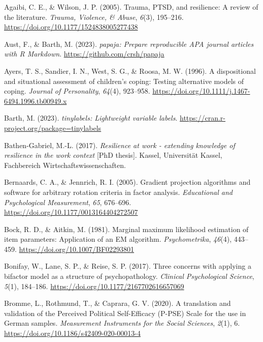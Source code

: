 \documentclass[
  man,floatsintext]{apa7}
\newlength{\cslhangindent}
\newenvironment{CSLReferences}[2] %
 {\begin{list}{}{%
  \setlength{\itemindent}{0pt}
  \setlength{\leftmargin}{0pt}
  \setlength{\parsep}{0pt}
  \ifodd #1
   \setlength{\leftmargin}{\cslhangindent}
   \setlength{\itemindent}{-1\cslhangindent}
  \fi
  \setlength{\itemsep}{#2\baselineskip}}}
 {\end{list}}
\begin{document}
\label{refs}
\begin{CSLReferences}{1}{0}
Agaibi, C. E., \& Wilson, J. P. (2005). Trauma, PTSD, and resilience: A review of the literature. \emph{Trauma, Violence, \& Abuse}, \emph{6}(3), 195--216. \url{https://doi.org/10.1177/1524838005277438}

Aust, F., \& Barth, M. (2023). \emph{{papaja}: {Prepare} reproducible {APA} journal articles with {R Markdown}}. \url{https://github.com/crsh/papaja}

Ayers, T. S., Sandier, I. N., West, S. G., \& Roosa, M. W. (1996). A dispositional and situational assessment of children's coping: Testing alternative models of coping. \emph{Journal of Personality}, \emph{64}(4), 923--958. \url{https://doi.org/10.1111/j.1467-6494.1996.tb00949.x}

Barth, M. (2023). \emph{{tinylabels}: Lightweight variable labels}. \url{https://cran.r-project.org/package=tinylabels}

Bathen-Gabriel, M.-L. (2017). \emph{Resilience at work - extending knowledge of resilience in the work context} {[}PhD thesis{]}. Kassel, Universität Kassel, Fachbereich Wirtschaftswissenschaften.

Bernaards, C. A., \& Jennrich, R. I. (2005). Gradient projection algorithms and software for arbitrary rotation criteria in factor analysis. \emph{Educational and Psychological Measurement}, \emph{65}, 676--696. \url{https://doi.org/10.1177/0013164404272507}

Bock, R. D., \& Aitkin, M. (1981). Marginal maximum likelihood estimation of item parameters: {Application} of an {EM} algorithm. \emph{Psychometrika}, \emph{46}(4), 443--459. \url{https://doi.org/10.1007/BF02293801}

Bonifay, W., Lane, S. P., \& Reise, S. P. (2017). Three concerns with applying a bifactor model as a structure of psychopathology. \emph{Clinical Psychological Science}, \emph{5}(1), 184--186. \url{https://doi.org/10.1177/2167702616657069}

Bromme, L., Rothmund, T., \& Caprara, G. V. (2020). A translation and validation of the {Perceived} {Political} {Self}-{Efficacy} ({P}-{PSE}) {Scale} for the use in {German} samples. \emph{Measurement Instruments for the Social Sciences}, \emph{2}(1), 6. \url{https://doi.org/10.1186/s42409-020-00013-4}


\end{CSLReferences}
\end{document}

